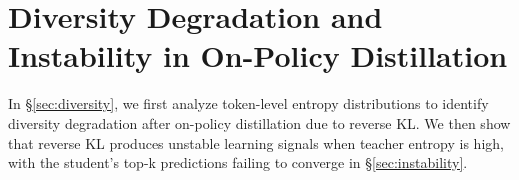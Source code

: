 
\section{Diversity Degradation and Instability in On-Policy Distillation} \label{sec:limit_opd}

In \S\ref{sec:diversity}, we first analyze token-level entropy distributions to identify diversity degradation after on-policy distillation due to reverse KL. We then show that reverse KL produces unstable learning signals when teacher entropy is high, with the student's top-k predictions failing to converge in \S\ref{sec:instability}.


